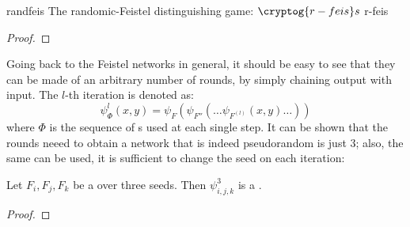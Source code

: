 \begin{cryptogame}
    {randfeis}
    {The randomic-Feistel distinguishing game: $\cryptog{r-feis}s$}
    {r-feis}


    \cseqdelay
    \cseqbeginloop
    \cseqendloop
    \cseqdelay


\end{cryptogame}

\begin{proof}
\end{proof}


Going back to the Feistel networks in general, it should be easy to see that they can be made of an arbitrary number of rounds, by simply chaining output with input. The $l$-th iteration is denoted as: 
\[
    \psi^l_\Phi(x, y) = \psi_{F}(\psi_{F''}( \ldots \psi_{F^{(l)}}(x, y) \ldots ))
\]
where $\Phi$ is the sequence of \prf{}s used at each single step. It can be shown that the rounds neeed to obtain a network that is indeed pseudorandom is just 3; also, the same \prf{} can be used, it is sufficient to change the seed on each iteration\footnotemark:

\begin{theorem}
    Let $F_i, F_j, F_k$ be a \prf{} over three seeds. Then $\psi^3_{i, j, k}$ is a \prp.
\end{theorem}


\begin{proof}
\end{proof}